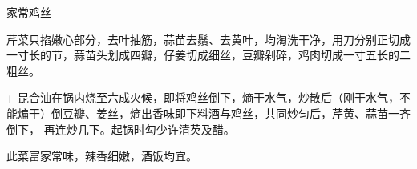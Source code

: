 \begin{recipe}{家常鸡丝}

\ingredients



\preparation

\step 芹菜只掐嫩心部分，去叶抽筋，蒜苗去鬚、去黄叶，均淘洗干净，用刀分别正切成
一寸长的节，蒜苗头划成四瓣，仔姜切成细丝，豆瓣剁碎，鸡肉切成一寸五长的二粗丝。

\step 」昆合油在锅内烧至六成火候，即将鸡丝倒下，熵干水气，炒散后（刚干水气，不
能煸干）倒豆瓣、姜丝，熵出香味即下料酒与鸡丝，共同炒匀后，芹黄、蒜苗一齐倒下，
再连炒几下。起锅时勾少许清芡及醋。

\features

此菜富家常味，辣香细嫩，酒饭均宜。

\end{recipe}

